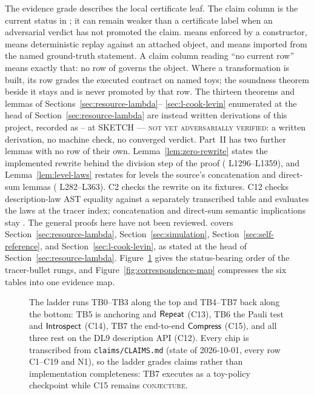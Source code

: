 The evidence grade describes the local certificate leaf.  The claim column is
the current status in ; it can remain weaker than a
certificate label when an adversarial verdict has not promoted the claim.
 means enforced by a constructor,
 means deterministic replay against an attached object, and
 means imported from the named ground-truth statement.
A claim column reading ``no current row'' means exactly that: no
row of  governs the object.  Where a transformation is
built, its row grades the executed contract on named toys; the soundness
theorem beside it stays  and is never promoted by that row.  The
thirteen theorems and lemmas of Sections~\ref{sec:resource-lambda}--%
\ref{sec:l-cook-levin} enumerated at the head of
Section~\ref{sec:resource-lambda} are instead written derivations of this
project, recorded as -- at \textsc{SKETCH --- not yet
adversarially verified}: a written derivation, no machine check, no converged
verdict.  Part~II has two further lemmas with no row of their own.
Lemma~\ref{lem:zero-rewrite} states the implemented rewrite behind the division
step of the  proof ( L1296--L1359), and
Lemma~\ref{lem:level-laws} restates for levels the source's concatenation and
direct-sum lemmas ( L282--L363).  C2 checks the rewrite on its
fixtures.  C12 checks description-law AST equality against a separately
transcribed table and evaluates the laws at the tracer index; concatenation
and direct-sum semantic implications stay .  The general proofs
here have not been reviewed.   covers Section~\ref{sec:resource-lambda}, 
Section~\ref{sec:simulation},  Section~\ref{sec:self-reference},
and  Section~\ref{sec:l-cook-levin}, as stated at the head of
Section~\ref{sec:resource-lambda}.
Figure~\ref{fig:ladder} gives the status-bearing order of the tracer-bullet
rungs, and Figure~\ref{fig:correspondence-map} compresses the six tables into
one evidence map.
\begin{figure}[H]
\centering

\caption{The ladder runs TB0--TB3 along the top and TB4--TB7 back along the bottom: TB5 is anchoring and \(\mathsf{Repeat}\) (C13), TB6 the Pauli test and \(\mathsf{Introspect}\) (C14), TB7 the end-to-end \(\mathsf{Compress}\) (C15), and all three rest on the DL9 description API (C12).  Every chip is transcribed from \texttt{claims/CLAIMS.md} (state of 2026-10-01, every row C1--C19 and N1), so the ladder grades claims rather than implementation completeness: TB7 executes as a toy-policy checkpoint while C15 remains \textsc{conjecture}.}
\label{fig:ladder}
\end{figure}
